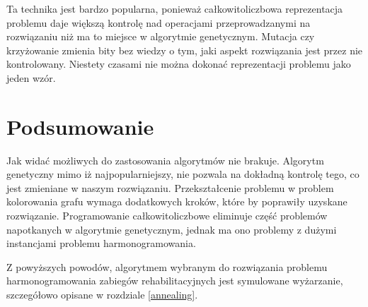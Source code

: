 Ta technika jest bardzo popularna, ponieważ całkowitoliczbowa reprezentacja problemu daje
większą kontrolę nad operacjami przeprowadzanymi na rozwiązaniu niż ma to miejsce w algorytmie
genetycznym. Mutacja czy krzyżowanie zmienia bity bez wiedzy o tym, jaki aspekt
rozwiązania jest przez nie kontrolowany. Niestety czasami nie można dokonać reprezentacji problemu jako jeden wzór.

\section{Podsumowanie}
Jak widać możliwych do zastosowania algorytmów nie brakuje. Algorytm genetyczny
mimo iż najpopularniejszy, nie pozwala na dokładną kontrolę tego, co jest
zmieniane w naszym rozwiązaniu. Przekształcenie problemu w problem kolorowania
grafu wymaga dodatkowych kroków, które by poprawiły uzyskane rozwiązanie.
Programowanie całkowitoliczbowe eliminuje część problemów napotkanych w
algorytmie genetycznym, jednak ma ono problemy z dużymi instancjami problemu
harmonogramowania.

Z powyższych powodów, algorytmem wybranym do rozwiązania problemu
harmonogramowania zabiegów rehabilitacyjnych jest symulowane wyżarzanie,
szczegółowo opisane w rozdziale \ref{annealing}.

